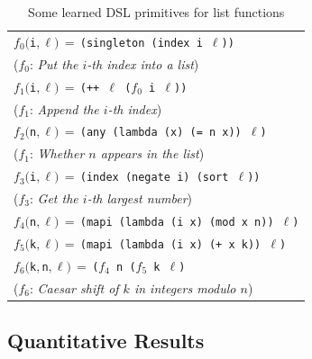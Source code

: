\documentclass{article}
\newcommand{\code}[1]{{\footnotesize\texttt{#1}}}
\begin{document}
\begin{table}[t]
  \centering
  \begin{tabular}{l}
    \toprule
    $f_0($\code{i$,\ell$}$) \,=\, $\code{(singleton (index i $\ell$))}\\
    \hspace{0.5cm}($f_0$: \emph{Put the $i$-th index into a list})\\
    $f_1($\code{i$,\ell$}$) \,=\, $\code{(++ $\ell$ ($f_0$ i $\ell$))}\\
    \hspace{0.5cm}($f_1$: \emph{Append the $i$-th index})\\
    $f_2($\code{n$,\ell$}$) \,=\, $\code{(any (lambda (x) (= n x)) $\ell$)}\\
    \hspace{0.5cm}($f_1$: \emph{Whether $n$ appears in the list})\\
    $f_3($\code{i$,\ell$}$) \,=\, $\code{(index (negate i) (sort $\ell$))}\\
    \hspace{0.5cm}($f_3$: \emph{Get the $i$-th largest number})\\
    $f_4($\code{n$,\ell$}$) \,=\, $\code{(mapi (lambda (i x) (mod x n)) $\ell$)}\\
    $f_5($\code{k$,\ell$}$) \,=\, $\code{(mapi (lambda (i x) (+ x k)) $\ell$)}\\
    $f_6($\code{k$,$n$,\ell$}$) \,=\, $\code{($f_4$ n ($f_5$ k $\ell$)}\\
    \hspace{0.5cm}($f_6$: \emph{Caesar shift of $k$ in integers modulo $n$})\\
  \bottomrule
  \end{tabular}
  \caption{Some learned DSL primitives for list functions}\label{listinduced}
\end{table}


\subsection{Quantitative Results}\label{quantitative}
\end{document}

